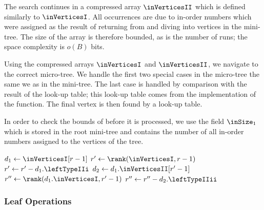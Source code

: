 The search continues in a compressed array $\inVerticesII$ which is defined similarly to $\inVerticesI$.
All occurrences are due to in-order numbers which were assigned as the result of returning from and diving into vertices in the mini-tree.
The size of the array is therefore bounded, as is the number of runs; the space complexity is $o(B)$ bits.

Using the compressed arrays $\inVerticesI$ and $\inVerticesII$, we navigate to the correct micro-tree.
We handle the first two special cases in the micro-tree the same we as in the mini-tree.
The last case is handled by comparison with the result of the \inSize{} look-up table; this look-up table comes from the implementation of the \inSize{} function.
The final vertex is then found by a look-up table.

In order to check the bounds of \inSelect{} before it is processed, we use the field $\inSize_1$ which is stored in the root mini-tree and contains the number of all in-order numbers assigned to the vertices of the tree.

\begin{algorithm}
\begin{algorithmic}
	\State $d_1 \gets \inVerticesI[r - 1]$
	\State $r' \gets \rank(\inVerticesI, r - 1)$
	 
		\State {}
	 
		\State {}
	\Else
		\State $r' \gets r' - d_1.\leftTypeIIi$
		 
			\State {}
		\Else {}
			\State $d_2 \gets d_1.\inVerticesII[r' - 1]$
			\State $r'' \gets \rank(d_1.\inVerticesI, r' - 1)$
			 
				\State {}
			 
				\State {}
			\Else
				\State $r'' \gets r'' - d_2.\leftTypeIIii$
				 
					\State {}
				\Else
					\State {}
				\EndIf
			\EndIf
		\EndIf
	\EndIf
\EndFunction
\end{algorithmic}
\end{algorithm}

\subsubsection{Leaf Operations}

